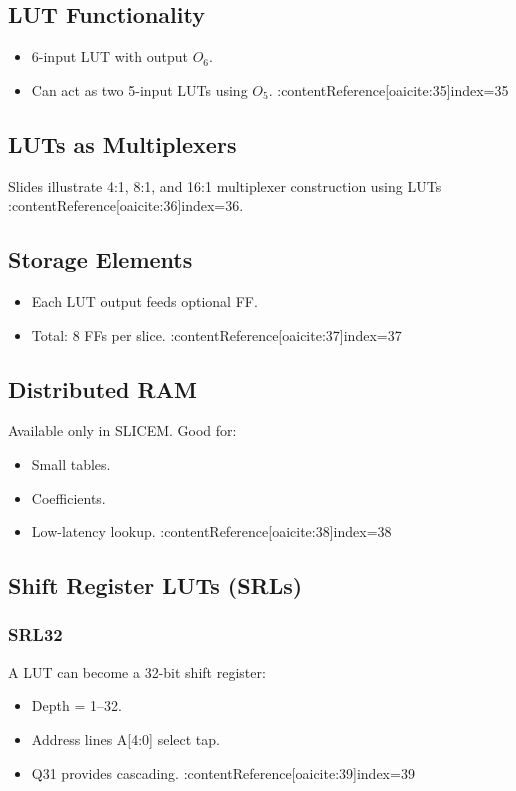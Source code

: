\documentclass[11pt]{article}
\begin{document}
\subsection{LUT Functionality}
\begin{itemize}
    \item 6-input LUT with output $O_6$.
    \item Can act as two 5-input LUTs using $O_5$. :contentReference[oaicite:35]{index=35}
\end{itemize}

\subsection{LUTs as Multiplexers}
Slides illustrate 4:1, 8:1, and 16:1 multiplexer construction using LUTs  
:contentReference[oaicite:36]{index=36}.

\subsection{Storage Elements}
\begin{itemize}
    \item Each LUT output feeds optional FF.
    \item Total: 8 FFs per slice. :contentReference[oaicite:37]{index=37}
\end{itemize}

\subsection{Distributed RAM}
Available only in SLICEM. Good for:
\begin{itemize}
    \item Small tables.
    \item Coefficients.
    \item Low-latency lookup. :contentReference[oaicite:38]{index=38}
\end{itemize}

\subsection{Shift Register LUTs (SRLs)}
\subsubsection*{SRL32}
A LUT can become a 32-bit shift register:
\begin{itemize}
    \item Depth = 1–32.
    \item Address lines A[4:0] select tap.
    \item Q31 provides cascading. :contentReference[oaicite:39]{index=39}
\end{itemize}
\end{document}
